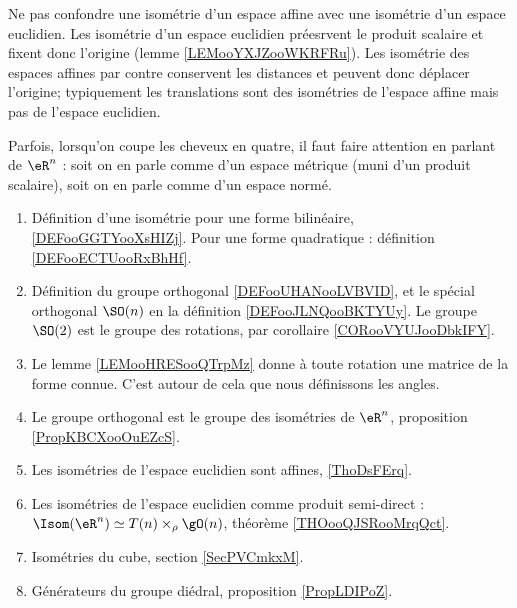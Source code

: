 
      \label{THMooVUCLooCrdbxm}

Ne pas confondre une isométrie d'un espace affine avec une isométrie d'un espace euclidien. Les isométrie d'un espace euclidien préesrvent le produit scalaire et fixent donc l'origine (lemme \ref{LEMooYXJZooWKRFRu}). Les isométrie des espaces affines par contre conservent les distances et peuvent donc déplacer l'origine; typiquement les translations sont des isométries de l'espace affine mais pas de l'espace euclidien.

Parfois, lorsqu'on coupe les cheveux en quatre, il faut faire attention en parlant de \( \eR^n\) : soit on en parle comme d'un espace métrique (muni d'un produit scalaire), soit on en parle comme d'un espace normé.

\begin{enumerate}
    \item 
        Définition d'une isométrie pour une forme bilinéaire, \ref{DEFooGGTYooXsHIZj}. Pour une forme quadratique : définition \ref{DEFooECTUooRxBhHf}.
    \item
        Définition du groupe orthogonal \ref{DEFooUHANooLVBVID}, et le spécial orthogonal \( \SO(n)\) en la définition \ref{DEFooJLNQooBKTYUy}. Le groupe \( \SO(2)\) est le groupe des rotations, par corollaire \ref{CORooVYUJooDbkIFY}.
    \item
        Le lemme \ref{LEMooHRESooQTrpMz} donne à toute rotation une matrice de la forme connue. C'est autour de cela que nous définissons les angles.
    \item
        Le groupe orthogonal est le groupe des isométries de \( \eR^n\), proposition \ref{PropKBCXooOuEZcS}.
    \item
        Les isométries de l'espace euclidien sont affines, \ref{ThoDsFErq}.
    \item
        Les isométries de l'espace euclidien comme produit semi-direct : $\Isom(\eR^n)\simeq T(n)\times_{\rho}\gO(n)$, théorème \ref{THOooQJSRooMrqQct}.
    \item
        Isométries du cube, section \ref{SecPVCmkxM}.
    \item 
        Générateurs du groupe diédral, proposition \ref{PropLDIPoZ}.
\end{enumerate}

